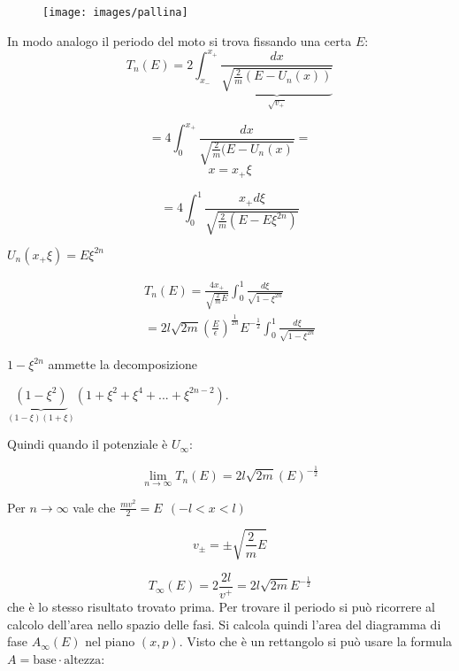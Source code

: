 \documentclass[Main.tex]{subfiles}
\begin{document}
\begin{appendic}
\begin{figure}[H]
    \centering
  \texttt{[image: images/pallina]}
\end{figure}

	In modo analogo il periodo del moto si trova fissando una certa $E$:
\begin{equation}
  	T_n(E)= 2 \int_{x_-} ^ {x_+} \frac{dx}{\underbrace{\sqrt{\frac{2}{m}(E-U_n(x))}}_{\sqrt{v_+}}}
\end{equation}

\begin{equation}
  	=4 \int_0 ^{x_+} \frac{dx}{\sqrt{\frac{2}{m}(E-U_n(x)}} =
\end{equation}
\begin{equation}
  {x=x_+ \xi}
\end{equation}

\begin{equation}
  	=4 \int_0 ^1 \frac{x_+ d\xi}{\sqrt{\frac{2}{m}(E-E \xi ^{2n})}}
\end{equation}

\newpage
\begin{osservazioni}
	\item $U_n(x_+ \xi) =E \xi^{2n}$

	\begin{gather}
  T_n (E) = \frac{4 x_+}{\sqrt{\frac{2}{m}E}} \int_0 ^1 \frac{d \xi}{\sqrt{1- \xi ^{2n}}}\\
	= 2l \sqrt{2m}  \left( \frac{E}{\epsilon} \right)^{\frac{1}{2n}}E^{- \frac{1}{2}} \int_0 ^1 \frac{d\xi}{\sqrt{1-\xi^{2n}}}
\end{gather}

\item $1-\xi ^{2n}$ ammette la decomposizione

 $\underbrace{(1-\xi^2)}_{(1-\xi)(1+\xi)}(1+\xi^2+\xi^4+... + \xi^{2n-2})$. 

Quindi quando il potenziale è $U_\infty$:

\begin{equation}
  	\lim_{n\rightarrow \infty} T_n (E) = 2l \sqrt{2m} \left( {E} \right)^{- \frac{1}{2}}
\end{equation}
\end{osservazioni}

\noindent 
Per $n \rightarrow \infty$ vale che $\frac{mv^2}{2} = E \ \ ( -l<x<l)$

	$$
	v_\pm = \pm \sqrt{\frac{2}{m}E}
	$$

	$$
	T_ \infty (E) = 2 \frac{2l}{v^+}= 2l \sqrt{2m} E^{-\frac{1}{2}}
	$$
    che è lo stesso risultato trovato prima.
    Per trovare il periodo si può ricorrere al calcolo dell'area nello spazio delle fasi. Si calcola quindi l'area del diagramma di fase $A_\infty (E)$ nel piano $(x,p)$. Visto che è un rettangolo si può usare la formula $A= \text{base} \cdot \text{altezza}$:



\end{appendic}
\end{document}
